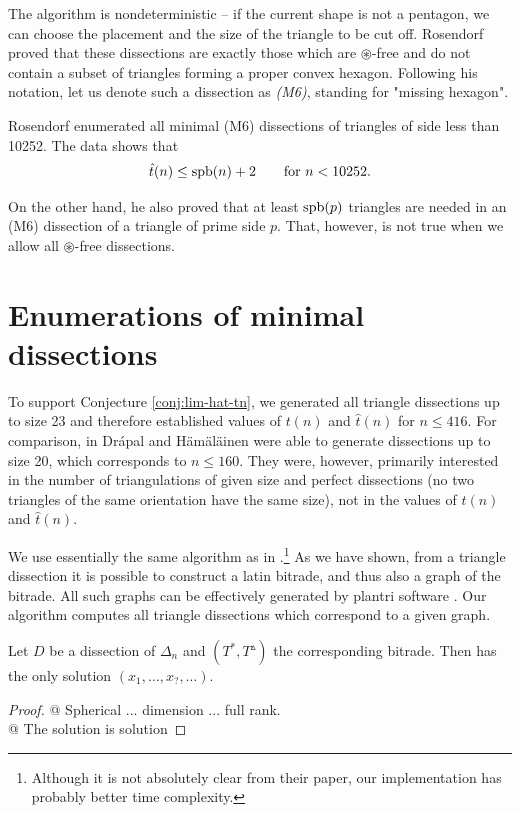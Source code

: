 The algorithm is nondeterministic -- if the current shape is not a pentagon, we can choose the placement and the size of the triangle to be cut off. Rosendorf proved that these dissections are exactly those which are $\circledast$-free and do not contain a subset of triangles forming a proper convex hexagon. Following his notation, let us denote such a dissection as \emph{(M6)}, standing for "missing hexagon".

Rosendorf enumerated all minimal (M6) dissections of triangles of side less than 10252. The data shows that
\begin{align}
	\hat{t}(n) \leq \mathop{\mathrm{spb}}(n)+2 \qquad\hbox{for $n < 10252$.}
\end{align}

On the other hand, he also proved that at least $\mathop{\mathrm{spb}}(p)$ triangles are needed in an (M6) dissection of a triangle of prime side $p$. That, however, is not true when we allow all $\circledast$-free dissections.


\section{Enumerations of minimal dissections}

To support Conjecture \ref{conj:lim-hat-tn}, we generated all triangle dissections up to size 23 and therefore established values of $t(n)$ and $\hat t(n)$ for $n \leq 416$. For comparison, in \cite{DrapalHamalainen10} Drápal and Hämäläinen were able to generate dissections up to size 20, which corresponds to $n \leq 160$. They were, however, primarily interested in the number of triangulations of given size and perfect dissections (no two triangles of the same orientation have the same size), not in the values of $t(n)$ and $\hat t(n)$.

We use essentially the same algorithm as in \cite{DrapalHamalainen10}.\footnote{Although it is not absolutely clear from their paper, our implementation has probably better time complexity.} As we have shown, from a triangle dissection it is possible to construct a latin bitrade, and thus also a graph of the bitrade. All such graphs can be effectively generated by plantri software \cite{BrinkmannMcKay99}. Our algorithm computes all triangle dissections which correspond to a given graph.


\begin{lem}
Let $D$ be a dissection of $\Delta_n$ and $(T^*, T^\vartriangle)$ the corresponding bitrade. Then
%
has the only solution $(x_1,\dots,x_?,\dots)$.
\end{lem}
\begin{proof}
@ Spherical ... dimension ... full rank. \\
@ The solution is solution
\end{proof}

